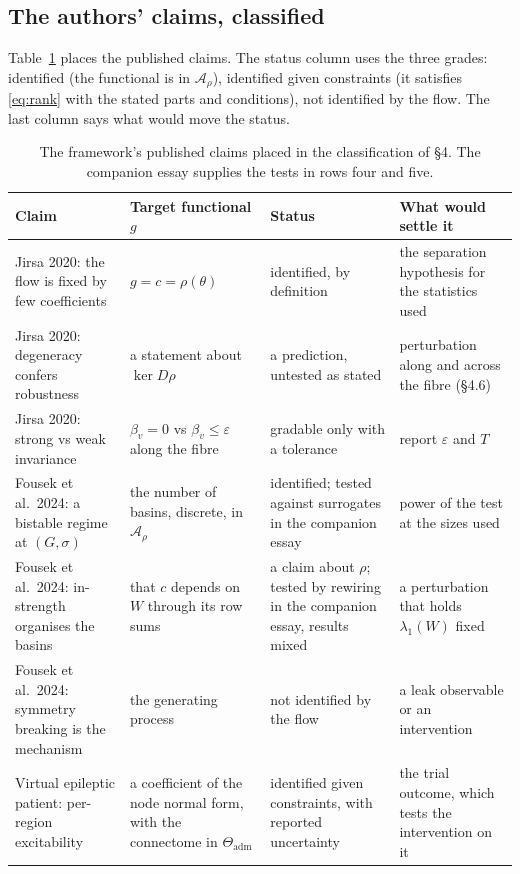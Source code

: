 \documentclass[10pt]{article}
\begin{document}
\subsection{The authors' claims, classified}
Table~\ref{tab:claims} places the published claims. The status column uses the three grades: identified (the functional is in $\mathcal{A}_\rho$), identified given constraints (it satisfies \eqref{eq:rank} with the stated parts and conditions), not identified by the flow. The last column says what would move the status.
\begin{table}[htbp]\centering\small
\begin{tabular}{@{}p{3.6cm}p{3.9cm}p{3.1cm}p{4.4cm}@{}}
\toprule
Claim & Target functional $g$ & Status & What would settle it \\
\midrule
Jirsa 2020: the flow is fixed by few coefficients & $g=c=\rho(\theta)$ & identified, by definition & the separation hypothesis for the statistics used \\
Jirsa 2020: degeneracy confers robustness & a statement about $\ker D\rho$ & a prediction, untested as stated & perturbation along and across the fibre (\S4.6) \\
Jirsa 2020: strong vs weak invariance & $\beta_v=0$ vs $\beta_v\le\varepsilon$ along the fibre & gradable only with a tolerance & report $\varepsilon$ and $T$ \\
Fousek et al.\ 2024: a bistable regime at $(G,\sigma)$ \parencite{fousek2024} & the number of basins, discrete, in $\mathcal{A}_\rho$ & identified; tested against surrogates in the companion essay & power of the test at the sizes used \\
Fousek et al.\ 2024: in-strength organises the basins & that $c$ depends on $W$ through its row sums & a claim about $\rho$; tested by rewiring in the companion essay, results mixed & a perturbation that holds $\lambda_1(W)$ fixed \\
Fousek et al.\ 2024: symmetry breaking is the mechanism & the generating process & not identified by the flow & a leak observable or an intervention \\
Virtual epileptic patient: per-region excitability \parencite{jirsa2017,wang2023} & a coefficient of the node normal form, with the connectome in $\Theta_{\mathrm{adm}}$ & identified given constraints, with reported uncertainty \parencite{hashemi2024} & the trial outcome, which tests the intervention on it \\
\bottomrule
\end{tabular}
\caption{The framework's published claims placed in the classification of \S4. The companion essay supplies the tests in rows four and five.}
\label{tab:claims}
\end{table}
\end{document}
